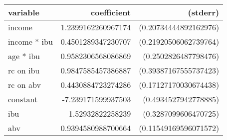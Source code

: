 \begin{tabular}{lrr}
\textbf{variable}&\textbf{coefficient}&\textbf{(stderr)}\\
\hline

income&1.2399162260967174&(0.20734444892162976)\\
income * ibu&0.4501289347230707&(0.21920506062739764)\\
age * ibu&0.9582306568086869&(0.2502826487798476)\\
rc on ibu&0.9847585457386887&(0.39387167555737423)\\
rc on abv&0.4430884723274286&(0.17127170030674438)\\
constant&-7.239171599937503&(0.4934527942778885)\\
ibu&1.52932822258239&(0.3287099606470725)\\
abv&0.9394580988700664&(0.11549169596071572)\\
\end{tabular}

